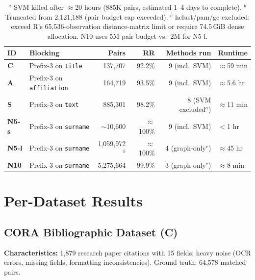 \documentclass[11pt, a4paper]{article}
\begin{document}
\begin{table}[h!]
\centering
\small
\begin{tabular}{llrrrl}
\toprule
\textbf{ID} & \textbf{Blocking} & \textbf{Pairs} & \textbf{RR} &
\textbf{Methods run} & \textbf{Runtime} \\
\midrule
\textbf{C}    & Prefix-3 on \texttt{title}       & 137,707   & 92.2\% & 9 (incl.\ SVM)      & $\approx$59 min \\
\textbf{A}    & Prefix-3 on \texttt{affiliation} & 164,719   & 93.5\% & 9 (incl.\ SVM)      & $\approx$5.6 hr \\
\textbf{S}    & Prefix-3 on \texttt{text}        & 885,301   & 98.2\% & 8 (SVM excluded$^a$)  & $\approx$11 min \\
\textbf{N5-s} & Prefix-3 on \texttt{surname}     & $\sim$10,600 & $\approx$100\% & 9 (incl.\ SVM) & $<$1 hr \\
\textbf{N5-l} & Prefix-3 on \texttt{surname}     & 1,059,972$^b$ & $\approx$100\% & 4 (graph-only$^c$) & $\approx$45 hr \\
\textbf{N10}  & Prefix-3 on \texttt{surname}     & 5,275,664 & 99.9\% & 3 (graph-only$^c$) & $\approx$8 min \\
\bottomrule
\end{tabular}
\caption{%
$^a$ SVM killed after $\approx$20 hours (885K pairs, estimated 1--4 days to complete).
$^b$ Truncated from 2,121,188 (pair budget cap exceeded).
$^c$ hclust/pam/gc excluded: exceed R's 65,536-observation distance-matrix limit or
require 74.5\,GiB dense allocation. N10 uses 5M pair budget vs.\ 2M for N5-l.}
\end{table}

\section{Per-Dataset Results}

\subsection{CORA Bibliographic Dataset (C)}

\textbf{Characteristics:} 1,879 research paper citations with 15 fields; heavy
noise (OCR errors, missing fields, formatting inconsistencies).
Ground truth: 64,578 matched pairs.
\end{document}
